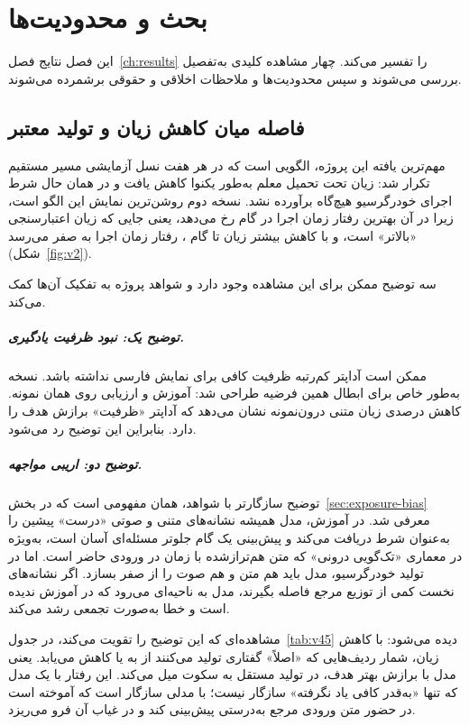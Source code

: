 
\chapter{بحث و محدودیت‌ها}
\label{ch:discussion}

این فصل نتایج فصل~\ref{ch:results} را تفسیر می‌کند. چهار مشاهده کلیدی
به‌تفصیل بررسی می‌شوند و سپس محدودیت‌ها و ملاحظات اخلاقی و حقوقی
برشمرده می‌شوند.

\section{فاصله میان کاهش زیان و تولید معتبر}
\label{sec:disc-gap}

مهم‌ترین یافته این پروژه، الگویی است که در هر هفت نسل آزمایشی مسیر مستقیم
تکرار شد: زیان تحت تحمیل معلم به‌طور یکنوا کاهش یافت و در همان حال شرط
اجرای خودرگرسیو هیچ‌گاه برآورده نشد. نسخه دوم روشن‌ترین نمایش این الگو
است، زیرا در آن بهترین رفتار زمان اجرا در گام  رخ می‌دهد، یعنی
جایی که زیان اعتبارسنجی «بالاتر» است، و با کاهش بیشتر زیان تا گام
، رفتار زمان اجرا به صفر می‌رسد (شکل~\ref{fig:v2}).

سه توضیح ممکن برای این مشاهده وجود دارد و شواهد پروژه به تفکیک آن‌ها کمک
می‌کند.

\paragraph{توضیح یک: نبود ظرفیت یادگیری.} ممکن است آداپتر کم‌رتبه
ظرفیت کافی برای نمایش فارسی نداشته باشد. نسخه  به‌طور خاص برای
ابطال همین فرضیه طراحی شد: آموزش و ارزیابی روی همان  نمونه. کاهش
 درصدی زیان متنی درون‌نمونه نشان می‌دهد که آداپتر «ظرفیت»
برازش هدف را دارد. بنابراین این توضیح رد می‌شود.

\paragraph{توضیح دو: اریبی مواجهه.} توضیح سازگارتر با شواهد، همان مفهومی
است که در بخش~\ref{sec:exposure-bias} معرفی شد. در آموزش، مدل همیشه
نشانه‌های متنی و صوتی «درست» پیشین را به‌عنوان شرط دریافت می‌کند و
پیش‌بینی یک گام جلوتر مسئله‌ای آسان است، به‌ویژه در معماری «تک‌گویی درونی»
که متن هم‌تراز‌شده با زمان در ورودی حاضر است. اما در تولید خودرگرسیو، مدل
باید هم متن و هم صوت را از صفر بسازد. اگر نشانه‌های نخست کمی از توزیع
مرجع فاصله بگیرند، مدل به ناحیه‌ای می‌رود که در آموزش ندیده است و خطا
به‌صورت تجمعی رشد می‌کند.

مشاهده‌ای که این توضیح را تقویت می‌کند، در جدول~\ref{tab:v45} دیده می‌شود:
با کاهش زیان، شمار ردیف‌هایی که «اصلاً» گفتاری تولید می‌کنند از
 به  یا  کاهش می‌یابد. یعنی مدل با برازش بهتر هدف، در تولید
مستقل به سکوت میل می‌کند. این رفتار با یک مدل که تنها «به‌قدر کافی
یاد نگرفته» سازگار نیست؛ با مدلی سازگار است که آموخته است در حضور متن
ورودی مرجع به‌درستی پیش‌بینی کند و در غیاب آن فرو می‌ریزد.

